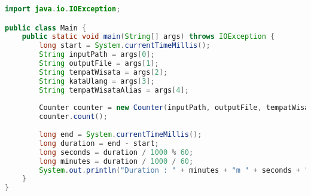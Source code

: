 \begin{lstlisting}[language=Java,basicstyle=\tiny,caption=Main.java (Tanpa MapReduce)]
import java.io.IOException;

public class Main {
    public static void main(String[] args) throws IOException {
        long start = System.currentTimeMillis();
        String inputPath = args[0];
        String outputFile = args[1];
        String tempatWisata = args[2]; 
        String kataUlang = args[3]; 
        String tempatWisataAlias = args[4]; 
        
        Counter counter = new Counter(inputPath, outputFile, tempatWisata, kataUlang, tempatWisataAlias);
        counter.count();
        
        long end = System.currentTimeMillis();
        long duration = end - start;
        long seconds = duration / 1000 % 60;
        long minutes = duration / 1000 / 60;
        System.out.println("Duration : " + minutes + "m " + seconds + "s ");
    }
}
\end{lstlisting}

